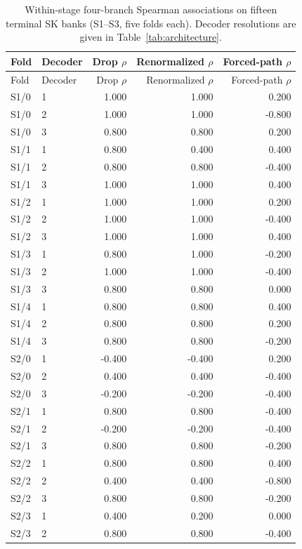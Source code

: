 \begin{longtable}{llrrr}
\caption{Within-stage four-branch Spearman associations on fifteen terminal SK banks (S1--S3, five folds each). Decoder resolutions are given in Table~\ref{tab:architecture}.}\label{tab:within}\\
\toprule
Fold & Decoder & Drop $\rho$ & Renormalized $\rho$ & Forced-path $\rho$ \\
\midrule
\endfirsthead
\toprule
Fold & Decoder & Drop $\rho$ & Renormalized $\rho$ & Forced-path $\rho$ \\
\midrule
\endhead
\midrule
\endfoot
\bottomrule
\endlastfoot
S1/0 & 1 & 1.000 & 1.000 & 0.200 \\
S1/0 & 2 & 1.000 & 1.000 & -0.800 \\
S1/0 & 3 & 0.800 & 0.800 & 0.200 \\
S1/1 & 1 & 0.800 & 0.400 & 0.400 \\
S1/1 & 2 & 0.800 & 0.800 & -0.400 \\
S1/1 & 3 & 1.000 & 1.000 & 0.400 \\
S1/2 & 1 & 1.000 & 1.000 & 0.200 \\
S1/2 & 2 & 1.000 & 1.000 & -0.400 \\
S1/2 & 3 & 1.000 & 1.000 & 0.400 \\
S1/3 & 1 & 0.800 & 1.000 & -0.200 \\
S1/3 & 2 & 1.000 & 1.000 & -0.400 \\
S1/3 & 3 & 0.800 & 0.800 & 0.000 \\
S1/4 & 1 & 0.800 & 0.800 & 0.400 \\
S1/4 & 2 & 0.800 & 0.800 & 0.200 \\
S1/4 & 3 & 0.800 & 0.800 & -0.200 \\
S2/0 & 1 & -0.400 & -0.400 & 0.200 \\
S2/0 & 2 & 0.400 & 0.400 & -0.400 \\
S2/0 & 3 & -0.200 & -0.200 & -0.400 \\
S2/1 & 1 & 0.800 & 0.800 & -0.400 \\
S2/1 & 2 & -0.200 & -0.200 & -0.400 \\
S2/1 & 3 & 0.800 & 0.800 & -0.200 \\
S2/2 & 1 & 0.800 & 0.800 & 0.400 \\
S2/2 & 2 & 0.400 & 0.400 & -0.800 \\
S2/2 & 3 & 0.800 & 0.800 & -0.200 \\
S2/3 & 1 & 0.400 & 0.200 & 0.000 \\
S2/3 & 2 & 0.800 & 0.800 & -0.400 \\

\end{longtable}
